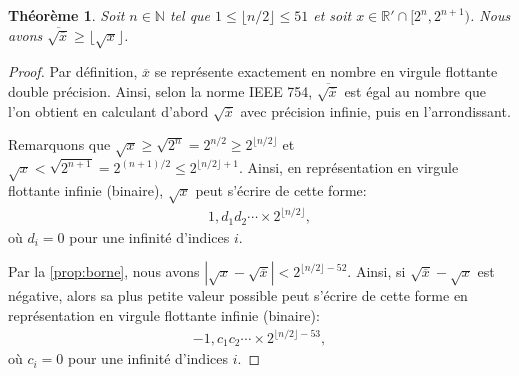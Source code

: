 \documentclass{article}
\newcommand{\N}{\mathbb{N}}
\newcommand{\R}{\mathbb{R}}
\newtheorem{theorem}{Théorème}
\begin{document}
\begin{theorem}\label{thm:racine}
  Soit $n \in \N$ tel que $1 \leq \lfloor n / 2 \rfloor \leq 51$ et
  soit $x \in \R' \cap [2^n, 2^{n+1})$. Nous avons
    $\overline{\sqrt{\overline{x}}} \geq \lfloor\sqrt{x}\rfloor$.
\end{theorem}
  
\begin{proof}
  Par définition, $\overline{x}$ se représente exactement en nombre en
  virgule flottante double précision. Ainsi, selon la norme IEEE 754,
  $\overline{\sqrt{\overline{x}}}$ est égal au nombre que l'on obtient
  en calculant d'abord $\sqrt{\overline{x}}$ avec précision infinie,
  puis en l'arrondissant.

  Remarquons que $\sqrt{x} \geq \sqrt{2^n} = 2^{n/2} \geq 2^{\lfloor
    n/2 \rfloor}$ et $\sqrt{x} < \sqrt{2^{n+1}} = 2^{(n+1)/2} \leq
  2^{\lfloor n/2 \rfloor + 1}$. Ainsi, en représentation en virgule
  flottante infinie (binaire), $\sqrt{x}$ peut s'écrire de cette
  forme:
  \begin{align}
  1{,}d_1 d_2 \cdots \times 2^{\lfloor n/2 \rfloor},\label{eq:forme1}
  \end{align}
  où $d_i = 0$ pour une infinité d'indices $i$.

  Par la \cref{prop:borne}, nous avons $|\sqrt{x} -
  \sqrt{\overline{x}}| < 2^{\lfloor n/2 \rfloor - 52}$. Ainsi, si
  $\sqrt{\overline{x}} - \sqrt{x}$ est négative, alors sa plus petite
  valeur possible peut s'écrire de cette forme en repré\-sen\-ta\-tion
  en virgule flottante infinie (binaire):
  \begin{align}
  -1{,}c_1 c_2 \cdots \times 2^{\lfloor n/2 \rfloor -
    53},\label{eq:forme2}
  \end{align}
  où $c_i = 0$ pour une infinité d'indices $i$.
  

\end{proof}
\end{document}
